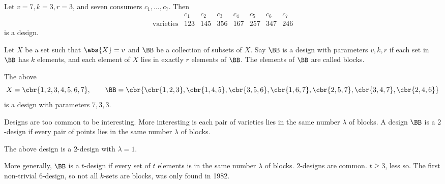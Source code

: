 \begin{example*}
Let $ v = 7, k = 3, r = 3 $, and seven consumers $ c_1, \dots, c_7 $. Then
$$
\begin{array}{c|ccccccc}
& c_1 & c_2 & c_3 & c_4 & c_5 & c_6 & c_7 \\
\hline
\text{varieties} & 123 & 145 & 356 & 167 & 257 & 347 & 246
\end{array}
$$
is a design.
\end{example*}

Let $ X $ be a set such that $ \abs{X} = v $ and $ \BB $ be a collection of subsets of $ X $. Say $ \BB $ is a design with parameters $ v, k, r $ if each set in $ \BB $ has $ k $ elements, and each element of $ X $ lies in exactly $ r $ elements of $ \BB $. The elements of $ \BB $ are called blocks.

\begin{example*}
The above
$$ X = \cbr{1, 2, 3, 4, 5, 6, 7}, \qquad \BB = \cbr{\cbr{1, 2, 3}, \cbr{1, 4, 5}, \cbr{3, 5, 6}, \cbr{1, 6, 7}, \cbr{2, 5, 7}, \cbr{3, 4, 7}, \cbr{2, 4, 6}} $$
is a design with parameters $ 7, 3, 3 $.
\end{example*}

Designs are too common to be interesting. More interesting is each pair of varieties lies in the same number $ \lambda $ of blocks. A design $ \BB $ is a $ 2 $-design if every pair of points lies in the same number $ \lambda $ of blocks.

\begin{example*}
The above design is a $ 2 $-design with $ \lambda = 1 $.
\end{example*}

More generally, $ \BB $ is a $ t $-design if every set of $ t $ elements is in the same number $ \lambda $ of blocks. $ 2 $-designs are common. $ t \ge 3 $, less so. The first non-trivial $ 6 $-design, so not all $ k $-sets are blocks, was only found in 1982.

